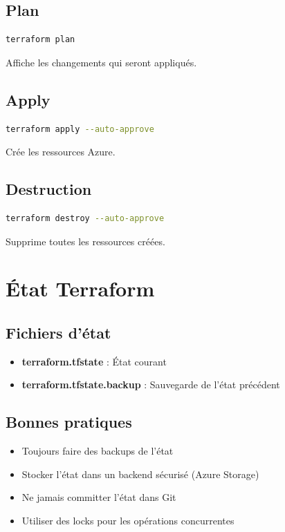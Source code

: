 \documentclass[12pt,a4paper,twoside]{report}
\begin{document}
\subsection{Plan}

\begin{lstlisting}[language=bash]
terraform plan
\end{lstlisting}

Affiche les changements qui seront appliqués.

\subsection{Apply}

\begin{lstlisting}[language=bash]
terraform apply --auto-approve
\end{lstlisting}

Crée les ressources Azure.

\subsection{Destruction}

\begin{lstlisting}[language=bash]
terraform destroy --auto-approve
\end{lstlisting}

Supprime toutes les ressources créées.

\section{État Terraform}

\subsection{Fichiers d'état}

\begin{itemize}
    \item \textbf{terraform.tfstate} : État courant
    \item \textbf{terraform.tfstate.backup} : Sauvegarde de l'état précédent
\end{itemize}

\subsection{Bonnes pratiques}

\begin{itemize}
    \item Toujours faire des backups de l'état
    \item Stocker l'état dans un backend sécurisé (Azure Storage)
    \item Ne jamais committer l'état dans Git
    \item Utiliser des locks pour les opérations concurrentes
\end{itemize}
\end{document}
